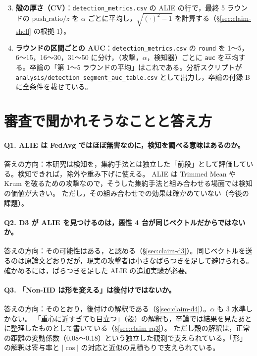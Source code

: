 \documentclass[a4j, dvipdfmx]{jsarticle}  %
\begin{document}
\begin{enumerate}
  \setcounter{enumi}{2}
  \item \textbf{殻の厚さ（CV）}：\texttt{detection\_metrics.csv} の ALIE の行で，最終 5 ラウンドの $\mathrm{push\_ratio}/z$ を $\alpha$ ごとに平均し，$\sqrt{(\cdot)^2 - 1}$ を計算する（\S\ref{sec:claim-shell} の根拠 1）。
  \item \textbf{ラウンドの区間ごとの AUC}：\texttt{detection\_metrics.csv} の \texttt{round} を 1〜5，6〜15，16〜30，31〜50 に分け，（攻撃，$\alpha$，検知器）ごとに \texttt{auc} を平均する。卒論の「第 1〜5 ラウンドの平均」はこれである。分析スクリプトが \texttt{analysis/detection\_segment\_auc\_table.csv} として出力し，卒論の付録 B に全条件を載せている。
\end{enumerate}

\section{審査で聞かれそうなことと答え方}
\label{sec:claims-qa}

\paragraph{Q1. ALIE は FedAvg ではほぼ無害なのに，検知を調べる意味はあるのか。}
答えの方向：本研究は検知を，集約手法とは独立した「前段」として評価している。検知できれば，除外や重み下げに使える。
ALIE は Trimmed Mean や Krum を破るための攻撃なので，そうした集約手法と組み合わせる場面では検知の価値が大きい。
ただし，その組み合わせでの効果は確かめていない（今後の課題）。

\paragraph{Q2. D3 が ALIE を見つけるのは，悪性 4 台が同じベクトルだからではないか。}
答えの方向：その可能性はある，と認める（\S\ref{sec:claim-d3}）。同じベクトルを送るのは原論文どおりだが，現実の攻撃者は小さなばらつきを足して避けられる。
確かめるには，ばらつきを足した ALIE の追加実験が必要。

\paragraph{Q3. 「Non-IID は形を変える」は後付けではないか。}
答えの方向：そのとおり，後付けの解釈である（\S\ref{sec:claim-d4}）。$\alpha$ も 3 水準しかない。
「重心に近すぎても目立つ」（殻）の解釈も，卒論では結果を見たあとに整理したものとして書いている（\S\ref{sec:claim-rq3}）。
ただし殻の解釈は，正常の距離の変動係数（0.08〜0.18）という独立した観測で支えられている。「形」の解釈は寄与率と $|\cos|$ の対応と近似の見積もりで支えられている。
\end{document}
